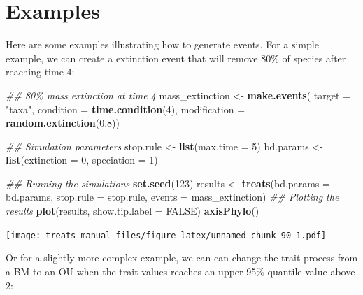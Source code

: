 \documentclass[
]{book}
\newenvironment{Shaded}{\begin{snugshade}}{\end{snugshade}}
\newcommand{\CommentTok}[1]{\textcolor[rgb]{0.56,0.35,0.01}{\textit{#1}}}
\newcommand{\DataTypeTok}[1]{\textcolor[rgb]{0.13,0.29,0.53}{#1}}
\newcommand{\DecValTok}[1]{\textcolor[rgb]{0.00,0.00,0.81}{#1}}
\newcommand{\FloatTok}[1]{\textcolor[rgb]{0.00,0.00,0.81}{#1}}
\newcommand{\KeywordTok}[1]{\textcolor[rgb]{0.13,0.29,0.53}{\textbf{#1}}}
\newcommand{\NormalTok}[1]{#1}
\newcommand{\OtherTok}[1]{\textcolor[rgb]{0.56,0.35,0.01}{#1}}
\newcommand{\StringTok}[1]{\textcolor[rgb]{0.31,0.60,0.02}{#1}}
\begin{document}
\hypertarget{examples}{%
\section{Examples}\label{examples}}

Here are some examples illustrating how to generate events.
For a simple example, we can create a extinction event that will remove 80\% of species after reaching time 4:

\begin{Shaded}
\begin{Highlighting}[]
\CommentTok{\#\# 80\% mass extinction at time 4}
\NormalTok{mass\_extinction \textless{}{-}}\StringTok{ }\KeywordTok{make.events}\NormalTok{(}
                      \DataTypeTok{target =} \StringTok{"taxa"}\NormalTok{,}
                      \DataTypeTok{condition =} \KeywordTok{time.condition}\NormalTok{(}\DecValTok{4}\NormalTok{),}
                      \DataTypeTok{modification =} \KeywordTok{random.extinction}\NormalTok{(}\FloatTok{0.8}\NormalTok{))}

\CommentTok{\#\# Simulation parameters}
\NormalTok{stop.rule \textless{}{-}}\StringTok{ }\KeywordTok{list}\NormalTok{(}\DataTypeTok{max.time =} \DecValTok{5}\NormalTok{)}
\NormalTok{bd.params \textless{}{-}}\StringTok{ }\KeywordTok{list}\NormalTok{(}\DataTypeTok{extinction =} \DecValTok{0}\NormalTok{, }\DataTypeTok{speciation =} \DecValTok{1}\NormalTok{)}

\CommentTok{\#\# Running the simulations}
\KeywordTok{set.seed}\NormalTok{(}\DecValTok{123}\NormalTok{)}
\NormalTok{results \textless{}{-}}\StringTok{ }\KeywordTok{treats}\NormalTok{(}\DataTypeTok{bd.params =}\NormalTok{ bd.params,}
                \DataTypeTok{stop.rule =}\NormalTok{ stop.rule,}
                \DataTypeTok{events =}\NormalTok{ mass\_extinction)}
\CommentTok{\#\# Plotting the results}
\KeywordTok{plot}\NormalTok{(results, }\DataTypeTok{show.tip.label =} \OtherTok{FALSE}\NormalTok{)}
\KeywordTok{axisPhylo}\NormalTok{()}
\end{Highlighting}
\end{Shaded}

\texttt{[image: treats\_manual\_files/figure-latex/unnamed-chunk-90-1.pdf]}

Or for a slightly more complex example, we can can change the trait process from a BM to an OU when the trait values reaches an upper 95\% quantile value above 2:
\end{document}
